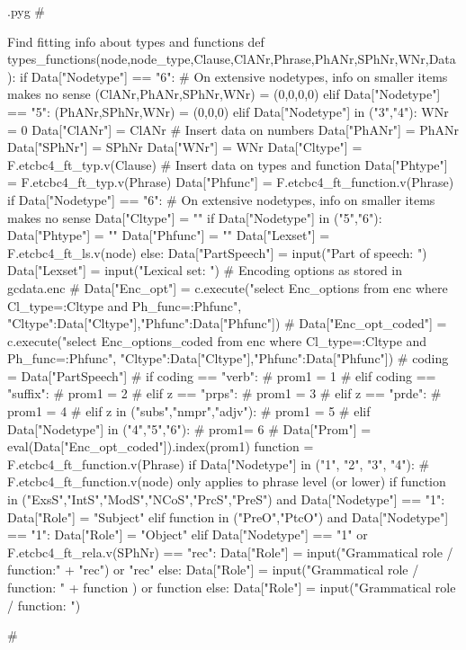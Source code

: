 \documentclass{report}
\makeatletter
\newenvironment{python}{%
  \VerbatimEnvironment
  \minted@resetoptions
  \setkeys{minted@opt}{}
      \begin{VerbatimOut}{\jobname.pyg}}
{%
      \end{VerbatimOut}
      \minted@pygmentize{python}
      \DeleteFile{\jobname.pyg}}
\makeatother
\begin{document}
\begin{python}
#{{{ Find fitting info about types and functions
def types_functions(node,node_type,Clause,ClANr,Phrase,PhANr,SPhNr,WNr,Data):
    if Data["Nodetype"] == "6":                # On extensive nodetypes, info on smaller items makes no sense
        (ClANr,PhANr,SPhNr,WNr) = (0,0,0,0)
    elif Data["Nodetype"] == "5":
        (PhANr,SPhNr,WNr) = (0,0,0)
    elif Data["Nodetype"] in ("3","4"):
        WNr = 0
    Data["ClANr"] = ClANr                      # Insert data on numbers
    Data["PhANr"] = PhANr
    Data["SPhNr"] = SPhNr
    Data["WNr"] = WNr
    Data["Cltype"] = F.etcbc4_ft_typ.v(Clause) # Insert data on types and function
    Data["Phtype"] = F.etcbc4_ft_typ.v(Phrase)
    Data["Phfunc"] = F.etcbc4_ft_function.v(Phrase)
    if Data["Nodetype"] == "6":                # On extensive nodetypes, info on smaller items makes no sense
        Data["Cltype"] = ""
    if Data["Nodetype"] in ("5","6"):
        Data["Phtype"] = ""
        Data["Phfunc"] = ""
        Data["Lexset"] = F.etcbc4_ft_ls.v(node)
    else:
        Data["PartSpeech"] = input("Part of speech: ")
        Data["Lexset"] = input("Lexical set: ")
        # Encoding options as stored in gcdata.enc
#        Data["Enc_opt"] = c.execute("select Enc_options from enc where Cl_type=:Cltype and Ph_func=:Phfunc", {"Cltype":Data["Cltype"],"Phfunc":Data["Phfunc"]})
#        Data["Enc_opt_coded"] = c.execute("select Enc_options_coded from enc where Cl_type=:Cltype and Ph_func=:Phfunc", {"Cltype":Data["Cltype"],"Phfunc":Data["Phfunc"]})
#        coding = Data["PartSpeech"]
#        if coding == "verb":
#            prom1 = 1
#        elif coding == "suffix":
#            prom1 = 2
#        elif z == "prps":
#            prom1 = 3
#        elif z == "prde":
#            prom1 = 4
#        elif z in ("subs","nmpr","adjv"):
#            prom1 = 5
#        elif Data["Nodetype"] in ("4","5","6"):
#            prom1= 6
#        Data["Prom"] = eval(Data["Enc_opt_coded"]).index(prom1)
    function = F.etcbc4_ft_function.v(Phrase)
    if Data["Nodetype"] in ("1", "2", "3", "4"):    # F.etcbc4_ft_function.v(node) only applies to phrase level (or lower)
        if function in ("ExsS","IntS","ModS","NCoS","PrcS","PreS") and Data["Nodetype"] == "1":
            Data["Role"] = "Subject"
        elif function in ("PreO","PtcO") and Data["Nodetype"] == "1":
            Data["Role"] = "Object"
        elif Data["Nodetype"] == "1" or F.etcbc4_ft_rela.v(SPhNr) == "rec":
            Data["Role"] = input("Grammatical role / function:" + "rec") or "rec"
        else:
            Data["Role"] = input("Grammatical role / function: " + function ) or function
    else:
        Data["Role"] = input("Grammatical role / function: ")

#}}}
\end{python}
\end{document}
